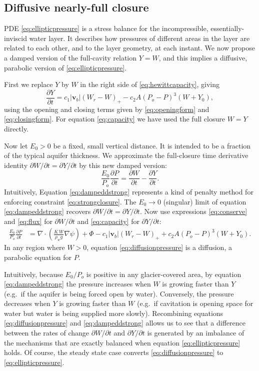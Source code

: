 \documentclass[11pt,final]{amsart}%
\newcommand\bv{\mathbf{v}}
\newcommand{\Div}{\nabla\cdot}
\newcommand{\grad}{\nabla}
\begin{document}
\subsection*{Diffusive nearly-full closure}  PDE \eqref{eq:ellipticpressure} is a stress balance for the incompressible, essentially-inviscid water layer.  It describes how pressures of different areas in the layer are related to each other, and to the layer geometry, at each instant.  We now propose a damped version of the full-cavity relation $Y=W$, and this implies a diffusive, parabolic version of \eqref{eq:ellipticpressure}.

First we replace $Y$ by $W$ in the right side of \eqref{eq:hewittcapacity}, giving
\begin{equation}
\frac{\partial Y}{\partial t} = c_1 |\bv_b| (W_r - W)_+ - c_2 A (P_o - P)^3 (W+Y_0), \label{eq:capacity}
\end{equation}
using the opening and closing terms given by \eqref{eq:openingform} and \eqref{eq:closingform}.  For equation \eqref{eq:capacity} we have used the full closure $W=Y$ directly.

Now let $E_0>0$ be a fixed, small vertical distance.  It is intended to be a fraction of the typical aquifer thickness.  We approximate the full-closure time derivative identity $\partial W/\partial t = \partial Y/\partial t$ by this new damped version:
\begin{equation}
\frac{E_0}{P_o} \frac{\partial P}{\partial t} =  \frac{\partial W}{\partial t}  - \frac{\partial Y}{\partial t}.\label{eq:dampeddstrong}
\end{equation}
Intuitively, Equation \eqref{eq:dampeddstrong} represents a kind of penalty method \citep{NocedalWright} for enforcing constraint \eqref{eq:strongclosure}.  The $E_0\to 0$ (singular) limit of equation \eqref{eq:dampeddstrong} recovers $\partial W/\partial t = \partial Y/\partial t$.  Now use expressions \eqref{eq:conserve} and \eqref{eq:flux} for $\partial W/\partial t$ and \eqref{eq:capacity} for $\partial Y/\partial t$:
\begin{align}
\frac{E_0}{P_o} \frac{\partial P}{\partial t} &= \Div \left(\frac{K\,W}{\rho_w g} \grad \psi\right) + \Phi - c_1 |\bv_b| (W_r - W)_+  + c_2 A (P_o - P)^3 (W+Y_0). \label{eq:diffusionpressure}
\end{align}
In any region where $W>0$, equation \eqref{eq:diffusionpressure} is a diffusion, a parabolic equation for $P$.

Intuitively, because $E_0/P_o$ is positive in any glacier-covered area, by equation \eqref{eq:dampeddstrong} the pressure increases when $W$ is growing faster than $Y$ (e.g.~if the aquifer is being forced open by water).  Conversely, the pressure decreases when $Y$ is growing faster than $W$ (e.g.~if cavitation is opening space for water but water is being supplied more slowly).  Recombining equations \eqref{eq:diffusionpressure} and \eqref{eq:dampeddstrong} allows us to see that a difference between the rates of change $\partial W/\partial t$ and $\partial Y/\partial t$ is generated by an imbalance of the mechanisms that are exactly balanced when equation \eqref{eq:ellipticpressure} holds.  Of course, the steady state case converts \eqref{eq:diffusionpressure} to \eqref{eq:ellipticpressure}.
\end{document}
